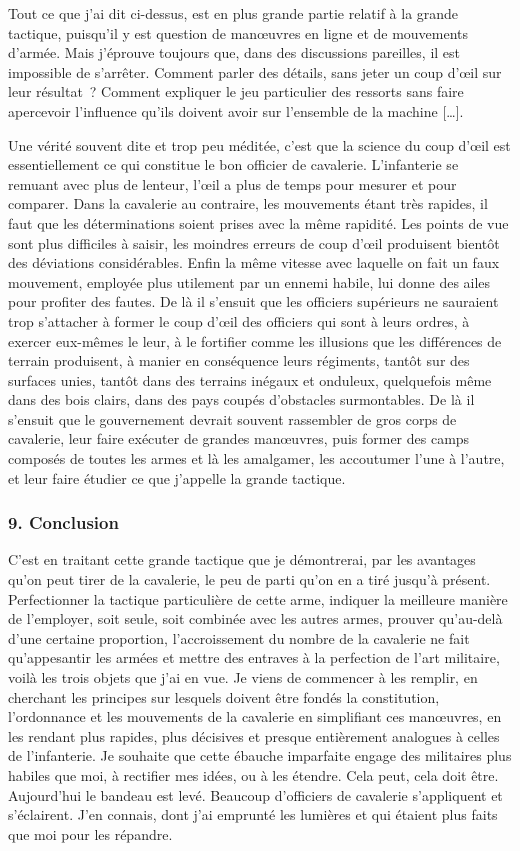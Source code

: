 \documentclass[french,twoside]{book} %
\begin{document}
Tout ce que j’ai dit ci-dessus, est en plus grande partie relatif à la grande tactique, puisqu’il y est question de manœuvres en ligne et de mouvements d’armée. Mais j’éprouve toujours que, dans des discussions pareilles, il est impossible de s’arrêter. Comment parler des détails, sans jeter un coup d’œil sur leur résultat ? Comment expliquer le jeu particulier des ressorts sans faire apercevoir l’influence qu’ils doivent avoir sur l’ensemble de la machine […].\par
Une vérité souvent dite et trop peu méditée, c’est que la science du coup d’œil est essentiellement ce qui constitue le bon officier de cavalerie. L’infanterie se remuant avec plus de lenteur, l’œil a plus de temps pour mesurer et pour comparer. Dans la cavalerie au contraire, les mouvements étant très rapides, il faut que les déterminations soient prises avec la même rapidité. Les points de vue sont plus difficiles à saisir, les moindres erreurs de coup d’œil produisent bientôt des déviations considérables. Enfin la même vitesse avec laquelle on fait un faux mouvement, employée plus utilement par un ennemi habile, lui donne des ailes pour profiter des fautes. De là il s’ensuit que les officiers supérieurs ne sauraient trop s’attacher à former le coup d’œil des officiers qui sont à leurs ordres, à exercer eux-mêmes le leur, à le fortifier comme les illusions que les différences de terrain produisent, à manier en conséquence leurs régiments, tantôt sur des surfaces unies, tantôt dans des terrains inégaux et onduleux, quelquefois même dans des bois clairs, dans des pays coupés d’obstacles surmontables. De là il s’ensuit que le gouvernement devrait souvent rassembler de gros corps de cavalerie, leur faire exécuter de grandes manœuvres, puis former des camps composés de toutes les armes et là les amalgamer, les accoutumer l’une à l’autre, et leur faire étudier ce que j’appelle la grande tactique.
\subsubsection[{9. Conclusion}]{9. Conclusion}
\noindent C’est en traitant cette grande tactique que je démontrerai, par les avantages qu’on peut tirer de la cavalerie, le peu de parti qu’on en a tiré jusqu’à présent. Perfectionner la tactique particulière de cette arme, indiquer la meilleure manière de l’employer, soit seule, soit combinée avec les autres armes, prouver qu’au-delà d’une certaine proportion, l’accroissement du nombre de la cavalerie ne fait qu’appesantir les armées et mettre des entraves à la perfection de l’art militaire, voilà les trois objets que j’ai en vue. Je viens de commencer à les remplir, en cherchant les principes sur lesquels doivent être fondés la constitution, l’ordonnance et les mouvements de la cavalerie en simplifiant ces manœuvres, en les rendant plus rapides, plus décisives et presque entièrement analogues à celles de l’infanterie. Je souhaite que cette ébauche imparfaite engage des militaires plus habiles que moi, à rectifier mes idées, ou à les étendre. Cela peut, cela doit être. Aujourd’hui le bandeau est levé. Beaucoup d’officiers de cavalerie s’appliquent et s’éclairent. J’en connais, dont j’ai emprunté les lumières et qui étaient plus faits que moi pour les répandre.
\end{document}

